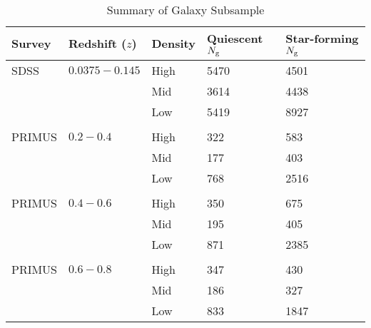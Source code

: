 \documentclass{emulateapj}
\begin{document}
\begin{table*} %
  \caption{Summary of Galaxy Subsample}
  \label{tab:subsample}
  \begin{center}
    \leavevmode
    \begin{tabular}{lllll} \hline \hline              
  Survey    &Redshift ($z$) &Density        &Quiescent $N_{\rm{g}}$ &Star-forming $N_{\rm{g}}$  \\ \hline 
  SDSS      &$0.0375-0.145$ &High           &5470                       &4501                           \\
            &               &Mid            &3614                       &4438                           \\
            &               &Low            &5419                       &8927                           \\
            &               &               &                       &                           \\ \hline
  PRIMUS    &$0.2-0.4$      &High           &322                    &583                           \\
            &               &Mid            &177                    &403                          \\
            &               &Low            &768                    &2516                           \\
            &               &               &                       &                           \\ \hline
  PRIMUS    &$0.4-0.6$      &High           &350                       &675                           \\
            &               &Mid            &195                       &405                           \\
            &               &Low            &871                       &2385                           \\
            &               &               &                       &                           \\ \hline
  PRIMUS    &$0.6-0.8$      &High           &347                       &430                           \\
            &               &Mid            &186                       &327                           \\
            &               &Low            &833                       &1847                           \\

\end{tabular}
\end{center}
\end{table*}
\end{document}
